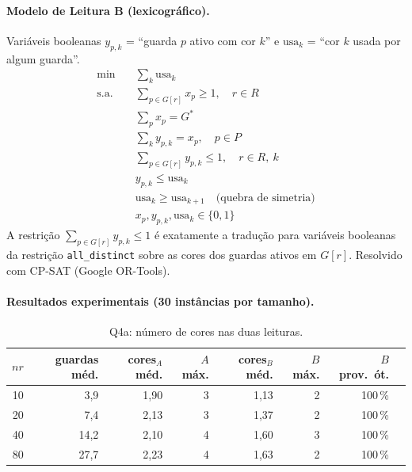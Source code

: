 \documentclass[11pt,a4paper]{article}
\begin{document}
\paragraph{Modelo de Leitura B (lexicográfico).} Variáveis
booleanas $y_{p,k}$ = ``guarda $p$ ativo com cor $k$'' e
$\text{usa}_k$ = ``cor $k$ usada por algum guarda''.
\begin{align*}
\min \quad & \textstyle\sum_k \text{usa}_k \\
\text{s.a.} \quad & \textstyle\sum_{p \in G[r]} x_p \ge 1, \quad r \in R \\
& \textstyle\sum_p x_p = G^* \\
& \textstyle\sum_k y_{p,k} = x_p, \quad p \in P \\
& \textstyle\sum_{p \in G[r]} y_{p,k} \le 1, \quad r \in R,\ k \\
& y_{p,k} \le \text{usa}_k \\
& \text{usa}_k \ge \text{usa}_{k+1} \quad \text{(quebra de simetria)} \\
& x_p, y_{p,k}, \text{usa}_k \in \{0,1\}
\end{align*}
A restrição $\sum_{p \in G[r]} y_{p,k} \le 1$ é exatamente a tradução
para variáveis booleanas da restrição \texttt{all\_distinct} sobre
as cores dos guardas ativos em $G[r]$. Resolvido com CP-SAT
(Google OR-Tools).

\paragraph{Resultados experimentais (30 instâncias por tamanho).}
\begin{table}[h]
\centering
\small
\begin{tabular}{rrrrrrrr}
\toprule
$nr$ & guardas méd. & cores$_A$ méd. & $A$ máx. & cores$_B$ méd. & $B$ máx. & $B$ prov.\ ót. \\
\midrule
 10 & 3{,}9 & 1{,}90 & 3 & 1{,}13 & 2 & 100\,\% \\
 20 & 7{,}4 & 2{,}13 & 3 & 1{,}37 & 2 & 100\,\% \\
 40 & 14{,}2 & 2{,}10 & 4 & 1{,}60 & 3 & 100\,\% \\
 80 & 27{,}7 & 2{,}23 & 4 & 1{,}63 & 2 & 100\,\% \\
\bottomrule
\end{tabular}
\caption{Q4a: número de cores nas duas leituras.}
\label{tab:q4a}
\end{table}
\end{document}
